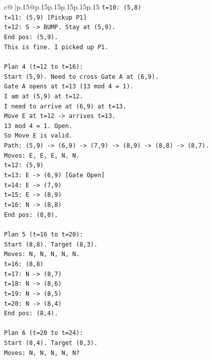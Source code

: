 \documentclass{article}
\begin{document}
{\begin{supertabular}{c@{$\;$}|p{.15\linewidth}@{}p{.15\linewidth}p{.15\linewidth}p{.15\linewidth}p{.15\linewidth}p{.15\linewidth}}
{{{\texttt{t=10: (5,8)} \\
\texttt{t=11: (5,9) {[}Pickup P1{]}} \\
\texttt{t=12: S {-}> BUMP. Stay at (5,9).} \\
\texttt{End pos: (5,9).} \\
\texttt{This is fine. I picked up P1.} \\
\\ 
\texttt{Plan 4 (t=12 to t=16):} \\
\texttt{Start (5,9). Need to cross Gate A at (6,9).} \\
\texttt{Gate A opens at t=13 (13 mod 4 = 1).} \\
\texttt{I am at (5,9) at t=12.} \\
\texttt{I need to arrive at (6,9) at t=13.} \\
\texttt{Move E at t=12 {-}> arrives t=13.} \\
\texttt{13 mod 4 = 1. Open.} \\
\texttt{So Move E is valid.} \\
\texttt{Path: (5,9) {-}> (6,9) {-}> (7,9) {-}> (8,9) {-}> (8,8) {-}> (8,7).} \\
\texttt{Moves: E, E, E, N, N.} \\
\texttt{t=12: (5,9)} \\
\texttt{t=13: E {-}> (6,9) {[}Gate Open{]}} \\
\texttt{t=14: E {-}> (7,9)} \\
\texttt{t=15: E {-}> (8,9)} \\
\texttt{t=16: N {-}> (8,8)} \\
\texttt{End pos: (8,8).} \\
\\ 
\texttt{Plan 5 (t=16 to t=20):} \\
\texttt{Start (8,8). Target (8,3).} \\
\texttt{Moves: N, N, N, N, N.} \\
\texttt{t=16: (8,8)} \\
\texttt{t=17: N {-}> (8,7)} \\
\texttt{t=18: N {-}> (8,6)} \\
\texttt{t=19: N {-}> (8,5)} \\
\texttt{t=20: N {-}> (8,4)} \\
\texttt{End pos: (8,4).} \\
\\ 
\texttt{Plan 6 (t=20 to t=24):} \\
\texttt{Start (8,4). Target (8,3).} \\
\texttt{Moves: N, N, N, N, N?} \\
}}}
\end{supertabular}}
\end{document}
